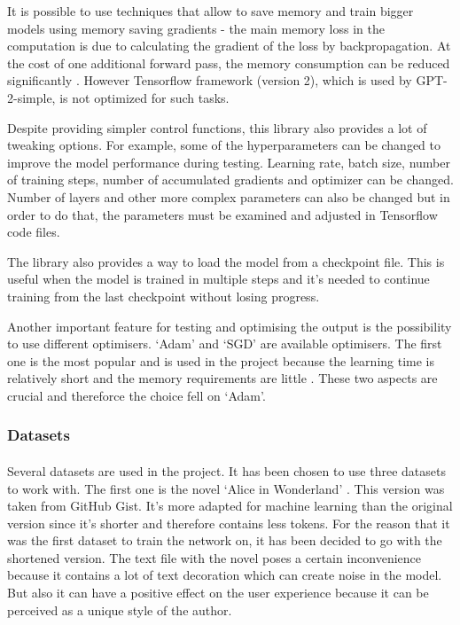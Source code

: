 \documentclass[12pt]{report}
\begin{document}
It is possible to use techniques that allow to save memory and train bigger models using memory saving gradients -
the main memory loss in the computation is due to calculating the gradient of the loss by backpropagation. At the
cost of one additional forward pass, the memory consumption can be reduced significantly \citep{chen_2016_training}.
However Tensorflow framework (version 2), which is used by GPT-2-simple, is not optimized for such tasks.

Despite providing simpler control functions, this library also provides a lot of tweaking options. For example, 
some of the hyperparameters can be changed to improve the model performance during testing. Learning rate, batch size,
number of training steps, number of accumulated gradients and optimizer can be changed. Number of layers and other
more complex parameters can also be changed but in order to do that, the parameters must be examined and adjusted in Tensorflow
code files.

The library also provides a way to load the model from a checkpoint file. This is useful when the model is trained
in multiple steps and it's needed to continue training from the last checkpoint without losing progress.

Another important feature for testing and optimising the output is the possibility to use different optimisers.
`Adam' and `SGD' are available optimisers. The first one is the most popular and is used in the project because 
the learning time is relatively short and the memory requirements are little \citep{musstafa_2022_optimizers}. 
These two aspects are crucial and thereforce the choice fell on `Adam'.



\subsubsection*{Datasets}
\paragraph{}
Several datasets are used in the project. It has been chosen to use three datasets to work with. The first one is
the novel `Alice in Wonderland' \citep{alice_in_wonderland}. This version was taken from GitHub Gist.
It's more adapted for machine learning than the original version since it's shorter and therefore contains less tokens.
For the reason that it was the first dataset to train the network on, it has been decided to go with the shortened version.
The text file with the novel poses a certain inconvenience because it contains a lot of text decoration which can create
noise in the model. But also it can have a positive effect on the user experience because it can be perceived as a
unique style of the author.
\end{document}
